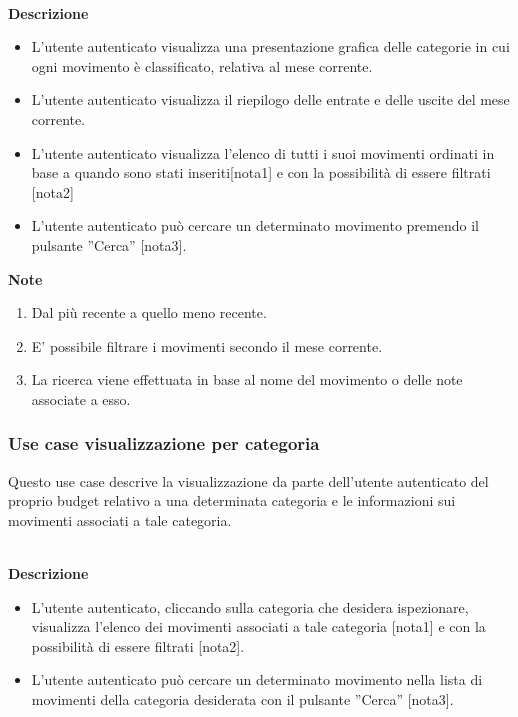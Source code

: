 \documentclass[a4paper,12pt]{article}
\begin{document}
\textbf{\\Descrizione}
\begin{itemize} \setlength\itemsep{0.01em}
\item L'utente autenticato visualizza una presentazione grafica delle categorie in cui ogni movimento è classificato, relativa al mese corrente.
\item L'utente autenticato visualizza il riepilogo delle entrate e delle uscite del mese corrente.
\item L'utente autenticato visualizza l'elenco di tutti i suoi movimenti ordinati in base a quando sono stati inseriti[nota1] e con la possibilità di essere filtrati [nota2]
\item L'utente autenticato può cercare un determinato movimento premendo il pulsante ''Cerca'' [nota3].
\end{itemize}

\textbf{Note}
\begin{enumerate} \setlength\itemsep{0.01em}
\item Dal più recente a quello meno recente.
\item E' possibile filtrare i movimenti secondo il mese corrente.
\item La ricerca viene effettuata in base al nome del movimento o delle note associate a esso.
\end{enumerate}


\subsubsection*{Use case visualizzazione per categoria}

Questo use case descrive la visualizzazione da parte dell'utente autenticato del proprio budget relativo a una determinata categoria e le informazioni sui movimenti associati a tale categoria.

\textbf{\\Descrizione}
\begin{itemize} \setlength\itemsep{0.01em}
\item L'utente autenticato, cliccando sulla categoria che desidera ispezionare, visualizza l'elenco dei movimenti associati a tale categoria [nota1] e con la possibilità di essere filtrati [nota2].
\item L'utente autenticato può cercare un determinato movimento nella lista di movimenti della categoria desiderata con il pulsante ''Cerca'' [nota3].
\end{itemize}
\end{document}
